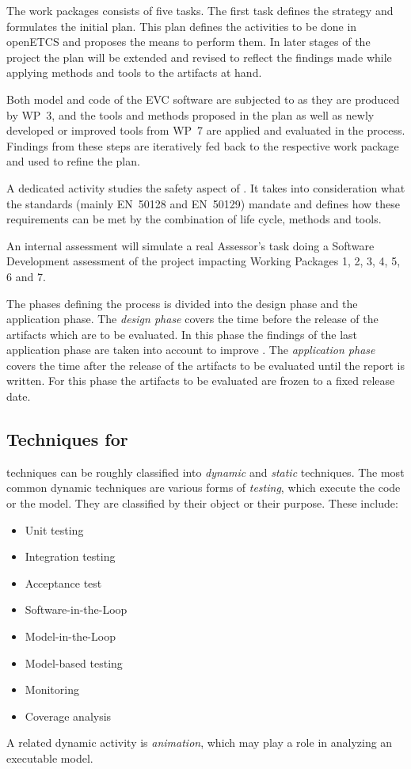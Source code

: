 The work packages consists of five tasks. The first task defines the
\vv strategy and formulates the initial \vv plan. This plan defines the
\vv activities to be done in openETCS and proposes the means to
perform them. In later stages of the project the plan will be extended
and revised to reflect the findings made while applying methods and
tools to the artifacts at hand.

Both model and code of the EVC software are subjected to \vv as they
are produced by WP~3, and the tools and methods proposed in the \vv
plan as well as newly developed or improved tools from WP~7 are applied
and evaluated in the process. Findings from these steps are
iteratively fed back to the respective work package and used to refine
the \vv plan.

A dedicated activity studies the safety aspect of \vv. It takes into
consideration what the standards (mainly EN~50128 and EN~50129) mandate
and defines how these requirements can be met by the combination of
life cycle, methods and tools.

An internal assessment will simulate a real Assessor's task doing a 
Software Development assessment of the project impacting Working Packages 
1, 2, 3, 4, 5, 6 and 7.

The phases defining the \vv process is divided into the design phase and 
the application phase. The \emph{design phase} covers the time before the 
release of the artifacts which are to be evaluated. In this phase the 
findings of the last application phase are taken into account to improve 
\vv.
The \emph{application phase} covers the time after the release of the 
artifacts to be evaluated until the \vv report is written. For this phase 
the artifacts to be evaluated are frozen to a fixed release date.  

\subsection*{Techniques for \VV}

\VV techniques can be roughly classified into \emph{dynamic} and
\emph{static} techniques.  The most common dynamic \vv techniques are
various forms of \emph{testing}, which execute the code or the
model. They are classified by their object or their purpose. These
include:
\begin{itemize}
\item Unit testing
\item Integration testing
\item Acceptance test
\item Software-in-the-Loop
\item Model-in-the-Loop
\item Model-based testing
\item Monitoring
\item Coverage analysis
\end{itemize}
A related dynamic activity is \emph{animation}, which may play a role
in analyzing an executable model.


